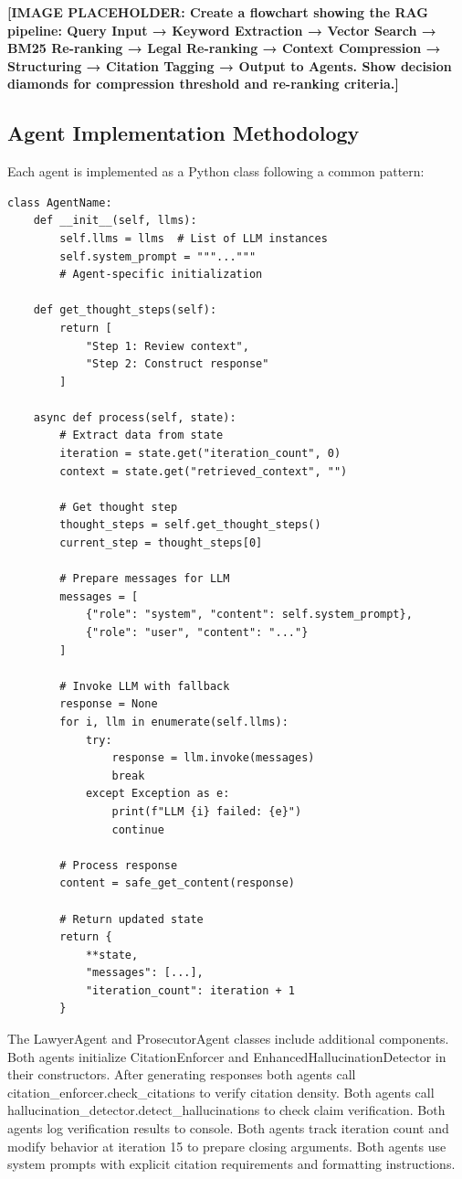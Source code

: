 \documentclass[12pt,singleside,a4paper]{article}
\begin{document}
\textbf{[IMAGE PLACEHOLDER: Create a flowchart showing the RAG pipeline: Query Input → Keyword Extraction → Vector Search → BM25 Re-ranking → Legal Re-ranking → Context Compression → Structuring → Citation Tagging → Output to Agents. Show decision diamonds for compression threshold and re-ranking criteria.]}

\subsection{Agent Implementation Methodology}
Each agent is implemented as a Python class following a common pattern:

\begin{lstlisting}
class AgentName:
    def __init__(self, llms):
        self.llms = llms  # List of LLM instances
        self.system_prompt = """..."""
        # Agent-specific initialization
        
    def get_thought_steps(self):
        return [
            "Step 1: Review context",
            "Step 2: Construct response"
        ]
    
    async def process(self, state):
        # Extract data from state
        iteration = state.get("iteration_count", 0)
        context = state.get("retrieved_context", "")
        
        # Get thought step
        thought_steps = self.get_thought_steps()
        current_step = thought_steps[0]
        
        # Prepare messages for LLM
        messages = [
            {"role": "system", "content": self.system_prompt},
            {"role": "user", "content": "..."}
        ]
        
        # Invoke LLM with fallback
        response = None
        for i, llm in enumerate(self.llms):
            try:
                response = llm.invoke(messages)
                break
            except Exception as e:
                print(f"LLM {i} failed: {e}")
                continue
        
        # Process response
        content = safe_get_content(response)
        
        # Return updated state
        return {
            **state,
            "messages": [...],
            "iteration_count": iteration + 1
        }
\end{lstlisting}

The LawyerAgent and ProsecutorAgent classes include additional components. Both agents initialize CitationEnforcer and EnhancedHallucinationDetector in their constructors. After generating responses both agents call citation\_enforcer.check\_citations to verify citation density. Both agents call hallucination\_detector.detect\_hallucinations to check claim verification. Both agents log verification results to console. Both agents track iteration count and modify behavior at iteration 15 to prepare closing arguments. Both agents use system prompts with explicit citation requirements and formatting instructions.
\end{document}

